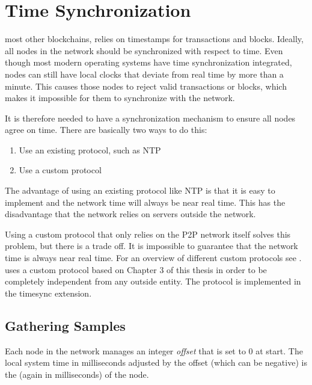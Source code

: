 \section{Time Synchronization}
\label{sec:timesync}


 most other blockchains, \codenamespace relies on timestamps for transactions and blocks.
Ideally, all nodes in the network should be synchronized with respect to time.
Even though most modern operating systems have time synchronization integrated,
nodes can still have local clocks that deviate from real time by more than a minute.
This causes those nodes to reject valid transactions or blocks, which makes it impossible for them to synchronize with the network.

It is therefore needed to have a synchronization mechanism to ensure all nodes agree on time.
There are basically two ways to do this:
\begin{enumerate}
\item Use an existing protocol, such as NTP
\item Use a custom protocol
\end{enumerate}

The advantage of using an existing protocol like NTP is that it is easy to implement and the network time will always be near real time.
This has the disadvantage that the network relies on servers outside the network.

Using a custom protocol that only relies on the P2P network itself solves this problem, but there is a trade off.
It is impossible to guarantee that the network time is always near real time.
For an overview of different custom protocols see \cite{Scipioni2009}.
\codenamespace uses a custom protocol based on Chapter 3 of this thesis in order to be completely independent from any outside entity.
The protocol is implemented in the timesync extension.

\subsection{Gathering Samples}

Each node in the network manages an integer \emph{offset} that is set to 0 at start.
The local system time in milliseconds adjusted by the offset (which can be negative) is the  (again in milliseconds) of the node.

